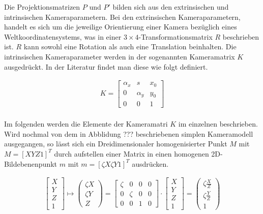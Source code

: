 Die Projektionsmatrizen $P$ und $P'$ bilden sich aus den extrinsischen und intrinsischen Kameraparametern. Bei den extrinsischen Kameraparametern, handelt es sich um die jeweilige Orientierung einer Kamera bezüglich eines Weltkoordinatensystems, was in einer $3\times 4$-Transformationsmatrix $R$ beschrieben ist. $R$ kann sowohl eine Rotation als auch eine Translation beinhalten. Die intrinsischen Kameraparameter werden in der sogenannten Kameramatrix $K$ ausgedrückt. In der Literatur findet man diese wie folgt definiert\cite{HZ}.

\begin{gather}
K=\begin{bmatrix}
\alpha_x&s&x_{0}\\
0&\alpha_y&y_{0}\\
0&0&1
\end{bmatrix}
\end{gather}\\

Im folgenden werden die Elemente der Kameramatri $K$ im einzelnen beschrieben. Wird nochmal von dem in Abblidung ??? beschriebenen simplen Kameramodell ausgegangen, so lässt sich ein Dreidimensionaler homogenisierter Punkt $M$ mit $M = [X Y Z 1]^T$ durch aufstellen einer Matrix in einen homogenen 2D-Bildebenenpunkt $m$ mit $m = [\zeta X \zeta Y 1]^T$ ausdrücken.

\begin{gather}
	\begin{bmatrix}
	X\\Y\\Z\\1
	\end{bmatrix} \mapsto
	\begin{pmatrix}
	\zeta X\\ \zeta Y\\ Z
	\end{pmatrix}
	=
	\begin{bmatrix}
	\zeta&0&0&0\\
	0&\zeta&0&0\\
	0&0&1&0
	\end{bmatrix}
	\cdot
	\begin{bmatrix}
	X\\Y\\Z\\1
	\end{bmatrix}
	=
	\begin{pmatrix}
	\zeta \frac{X}{Z}\\ \zeta \frac{Y}{Z}\\1
	\end{pmatrix}
\end{gather}\\



